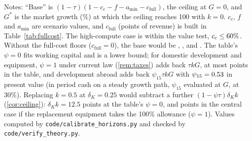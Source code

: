 \begin{table}[t]
\smallskip
\begin{minipage}{0.95\linewidth}\footnotesize
Notes: ``Base'' is $(1-\tau)(1-c_c-f-a_{\min}-c_{\mathrm{full}})$, the ceiling at $G=0$, and $G^*$ is the market growth (\%) at which the ceiling reaches 100 with $k=0$. $c_c$, $f$ and $a_{\min}$ are scenario values, and $c_{\mathrm{full}}$ (points of revenue) is built in Table~\ref{tab:fullcost}. The high-compute case is within the value test, $c_c\le60\%$. Without the full-cost floors ($c_{\mathrm{full}}=0$), the base would be \MarginAccFav, \MarginAccCen, \MarginAccCons{} and \MarginAccHigh. The table's $\psi=0$ fits working capital and is a lower bound; for domestic development and equipment, $\psi=1$ under current law (\autoref{rem:taxes}) adds back $\tau kG$, at most \PsiAddMax{} points in the table, and development abroad adds back $\psi_{15}\tau kG$ with $\psi_{15}=0.53$ in present value (in period cash on a steady growth path, $\psi_{15}$ evaluated at $G$, \PsiFifteenCashThirty{} at 30\%). Replacing $k=0.5$ at $\delta_K=0.25$ would subtract a further $(1-\psi\tau)\delta_Kk$ (\autoref{cor:ceiling}): $\delta_Kk=12.5$ points at the table's $\psi=0$, and \ReplCen{} points in the central case if the replacement equipment takes the 100\% allowance ($\psi=1$). Values computed by \texttt{code/calibrate\_horizons.py} and checked by \texttt{code/verify\_theory.py}.
\end{minipage}
\end{table}

